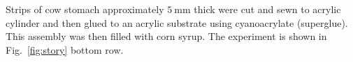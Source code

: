 Strips of cow stomach approximately $\SI{5}{\milli\metre}$ thick were cut and sewn to acrylic cylinder and then glued to an acrylic substrate using cyanoacrylate (superglue). This assembly was then filled with corn syrup. The experiment is shown in Fig.~\ref{fig:story} bottom row. 



